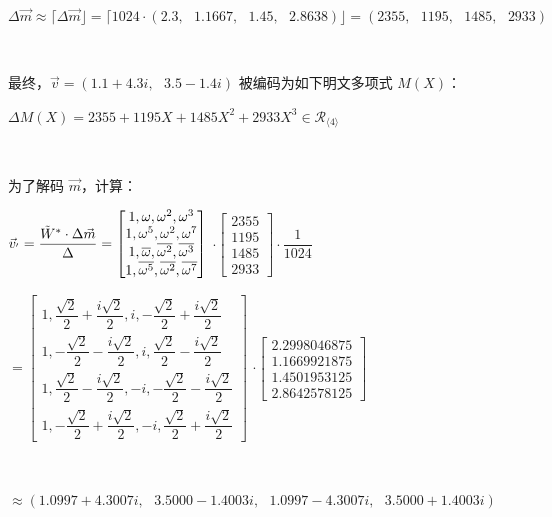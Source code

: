 $\Delta\vec{m} \approx \lceil \Delta \vec{m} \rfloor = \lceil 1024 \cdot (2.3, \text{ } 1.1667, \text{ } 1.45, \text{ } 2.8638) \rfloor = (2355, \text{ } 1195, \text{ } 1485, \text{ } 2933)$

$ $

最终，$\vec{v} = (1.1 + 4.3i, \text{ } 3.5 - 1.4i)$ 被编码为如下明文多项式 $M(X)$：

$\Delta M(X) = 2355 +  1195X + 1485X^2 + 2933X^3 \in \mathcal{R}_{\langle 4 \rangle}$

$ $


为了解码 $\vec{m}$，计算：

$\vec{v}_{'} = \dfrac{\tilde W^*\cdot\Delta\vec{m}}{\Delta} = \begin{bmatrix}
1,\omega,\omega^2, \omega^3\\
1,\omega^5, \omega^2,\omega^7\\
1,\overline{\omega}, \overline{\omega^2}, \overline{\omega^3}\\
1,\overline{\omega^5}, \overline{\omega^2}, \overline{\omega^7}
\end{bmatrix}$
$\cdot \begin{bmatrix}
2355\\1195\\1485\\2933
\end{bmatrix}\cdot \dfrac{1}{1024}$

$=
\begin{bmatrix}
1,\dfrac{\sqrt{2}}{2} + \dfrac{i\sqrt{2}}{2},i, -\dfrac{\sqrt{2}}{2} + \dfrac{i\sqrt{2}}{2}\\
1,-\dfrac{\sqrt{2}}{2} - \dfrac{i\sqrt{2}}{2}, i,\dfrac{\sqrt{2}}{2} - \dfrac{i\sqrt{2}}{2}\\
1,\dfrac{\sqrt{2}}{2} - \dfrac{i\sqrt{2}}{2}, -i, -\dfrac{\sqrt{2}}{2} - \dfrac{i\sqrt{2}}{2}\\
1,-\dfrac{\sqrt{2}}{2} + \dfrac{i\sqrt{2}}{2}, -i, \dfrac{\sqrt{2}}{2} + \dfrac{i\sqrt{2}}{2}
\end{bmatrix}$
$\cdot \begin{bmatrix}
2.2998046875\\1.1669921875\\1.4501953125\\2.8642578125
\end{bmatrix}$

$ $

$ \approx (1.0997+4.3007i, \text{ } 3.5000-1.4003i, \text{ } 1.0997-4.3007i, \text{ } 3.5000+1.4003i)$

$ $

